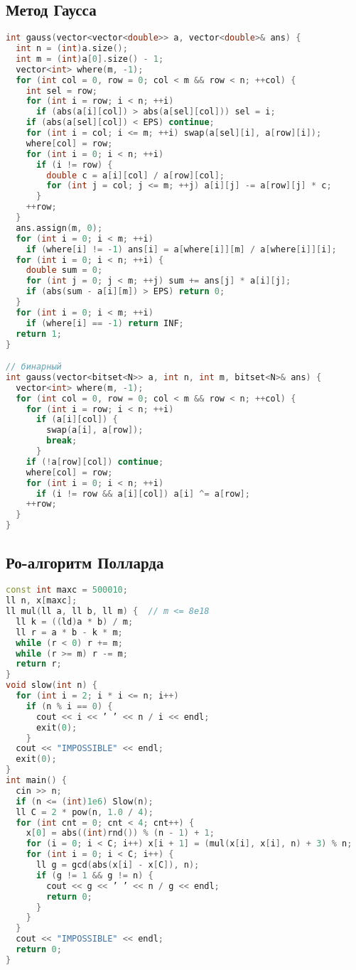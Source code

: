 \documentclass[10pt,a4paper,landscape,twosided]{extarticle}
\begin{document}
\begin{multicols}{3}
\subsection{Метод Гаусса}
\begin{lstlisting}[language=C++]
int gauss(vector<vector<double>> a, vector<double>& ans) {
  int n = (int)a.size();
  int m = (int)a[0].size() - 1;
  vector<int> where(m, -1);
  for (int col = 0, row = 0; col < m && row < n; ++col) {
    int sel = row;
    for (int i = row; i < n; ++i)
      if (abs(a[i][col]) > abs(a[sel][col])) sel = i;
    if (abs(a[sel][col]) < EPS) continue;
    for (int i = col; i <= m; ++i) swap(a[sel][i], a[row][i]);
    where[col] = row;
    for (int i = 0; i < n; ++i)
      if (i != row) {
        double c = a[i][col] / a[row][col];
        for (int j = col; j <= m; ++j) a[i][j] -= a[row][j] * c;
      }
    ++row;
  }
  ans.assign(m, 0);
  for (int i = 0; i < m; ++i)
    if (where[i] != -1) ans[i] = a[where[i]][m] / a[where[i]][i];
  for (int i = 0; i < n; ++i) {
    double sum = 0;
    for (int j = 0; j < m; ++j) sum += ans[j] * a[i][j];
    if (abs(sum - a[i][m]) > EPS) return 0;
  }
  for (int i = 0; i < m; ++i)
    if (where[i] == -1) return INF;
  return 1;
}

// бинарный
int gauss(vector<bitset<N>> a, int n, int m, bitset<N>& ans) {
  vector<int> where(m, -1);
  for (int col = 0, row = 0; col < m && row < n; ++col) {
    for (int i = row; i < n; ++i)
      if (a[i][col]) {
        swap(a[i], a[row]);
        break;
      }
    if (!a[row][col]) continue;
    where[col] = row;
    for (int i = 0; i < n; ++i)
      if (i != row && a[i][col]) a[i] ^= a[row];
    ++row;
  }
}\end{lstlisting}

\subsection{Ро-алгоритм Полларда}
\begin{lstlisting}[language=C++]
const int maxc = 500010;
ll n, x[maxc];
ll mul(ll a, ll b, ll m) {  // m <= 8e18
  ll k = ((ld)a * b) / m;
  ll r = a * b - k * m;
  while (r < 0) r += m;
  while (r >= m) r -= m;
  return r;
}
void slow(int n) {
  for (int i = 2; i * i <= n; i++)
    if (n % i == 0) {
      cout << i << ’ ’ << n / i << endl;
      exit(0);
    }
  cout << "IMPOSSIBLE" << endl;
  exit(0);
}
int main() {
  cin >> n;
  if (n <= (int)1e6) Slow(n);
  ll C = 2 * pow(n, 1.0 / 4);
  for (int cnt = 0; cnt < 4; cnt++) {
    x[0] = abs((int)rnd()) % (n - 1) + 1;
    for (i = 0; i < C; i++) x[i + 1] = (mul(x[i], x[i], n) + 3) % n;
    for (int i = 0; i < C; i++) {
      ll g = gcd(abs(x[i] - x[C]), n);
      if (g != 1 && g != n) {
        cout << g << ’ ’ << n / g << endl;
        return 0;
      }
    }
  }
  cout << "IMPOSSIBLE" << endl;
  return 0;
}\end{lstlisting}
\end{multicols}
\end{document}
